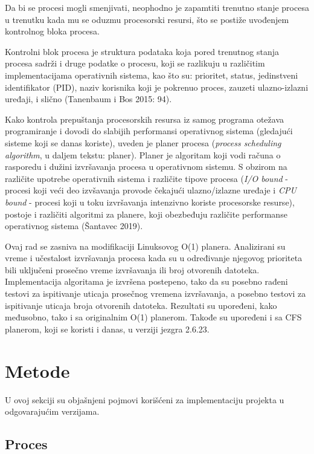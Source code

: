 Da bi se procesi mogli smenjivati, neophodno je zapamtiti trenutno stanje procesa u trenutku kada mu se oduzmu procesorski resursi, što se postiže uvođenjem kontrolnog bloka procesa.

Kontrolni blok procesa je struktura podataka koja pored trenutnog stanja procesa sadrži i druge podatke o procesu, koji se razlikuju u različitim implementacijama operativnih sistema, kao što su: prioritet, status, jedinstveni identifikator (PID), naziv korisnika koji je pokrenuo proces, zauzeti ulazno-izlazni uređaji, i slično (Tanenbaum i Bos 2015: 94).

\AuthorExHere

Kako kontrola prepuštanja procesorskih resursa iz samog programa otežava programiranje i dovodi do slabijih performansi operativnog sistema (gledajući sisteme koji se danas koriste), uveden je planer procesa (\emph{process scheduling algorithm}, u daljem tekstu: planer). Planer je algoritam koji vodi računa o rasporedu i dužini izvršavanja procesa u operativnom sistemu. S obzirom na različite upotrebe operativnih sistema i različite tipove procesa (\emph{I/O bound} - procesi koji veći deo izvšavanja provode čekajući ulazno/izlazne uređaje i \emph{CPU bound} - procesi koji u toku izvršavanja intenzivno koriste procesorske resurse), postoje i različiti algoritmi za planere, koji obezbeđuju različite performanse operativnog sistema (Šantavec 2019).

Ovaj rad se zasniva na modifikaciji Linuksovog O(1) planera. Analizirani su vreme i učestalost izvršavanja procesa kada su u određivanje njegovog prioriteta bili uključeni prosečno vreme izvršavanja ili broj otvorenih datoteka. Implementacija algoritama je izvršena postepeno, tako da su posebno rađeni testovi za ispitivanje uticaja prosečnog vremena izvršavanja, a posebno testovi za ispitivanje uticaja broja otvorenih datoteka. Rezultati su upoređeni, kako međusobno, tako i sa originalnim O(1) planerom. Takođe su upoređeni i sa CFS planerom, koji se koristi i danas, u verziji jezgra 2.6.23.

\section{Metode}

U ovoj sekciji su objašnjeni pojmovi korišćeni za implementaciju projekta u odgovarajućim verzijama.

\subsection{Proces}

